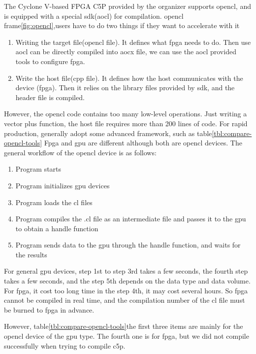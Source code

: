 The Cyclone V-based FPGA C5P provided by the organizer supports opencl, and is equipped with a special sdk(aocl) for compilation.
opencl frame\ref{fig:opencl},users have to do two things if they want to accelerate with it
\begin{enumerate}
  \item Writing the target file(opencl file). It defines what fpga needs to do. Then use aocl can be directly compiled into aocx file, we can use the aocl provided tools to configure fpga.
  \item Write the host file(cpp file). It defines how the host communicates with the device (fpga). Then it relies on the library files provided by sdk, and the header file is compiled.
\end{enumerate}

However, the opencl code contains too many low-level operations. Just writing a vector plus function, the host file requires more than 200 lines of code. For rapid production, generally adopt some advanced framework, such as table\ref{tbl:compare-opencl-tools}
Fpga and gpu are different although both are opencl devices.
The general workflow of the opencl device is as follows:
\begin{enumerate}
  \item Program starts
  \item Program initializes gpu devices
  \item	Program loads the cl files
  \item	Program compiles the .cl file as an intermediate file and passes it to the gpu to obtain a handle function
  \item Program sends data to the gpu through the handle function, and waits for the results
\end{enumerate}

For general gpu devices, step 1st to step 3rd takes a few seconds, the fourth step takes a few seconds, and the step 5th depends on the data type and data volume.
For fpga, it cost too long time in the step 4th, it may cost several hours. So fpga cannot be compiled in real time, and the compilation number of the cl file must be burned to fpga in advance.

However, table\ref{tbl:compare-opencl-tools}the first three items are mainly for the opencl device of the gpu type. The fourth one is for fpga, but we did not compile successfully when trying to compile c5p.

